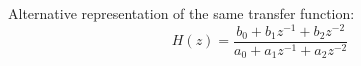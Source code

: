 %
%
%
%
%
%
%
%
Alternative representation of the same transfer function:
\begin{equation*}
	H(z) = \frac{b_0 + b_1 z^{-1} + b_2 z^{-2}}{a_0 + a_1 z^{-1} + a_2 z^{-2}}
\end{equation*}


